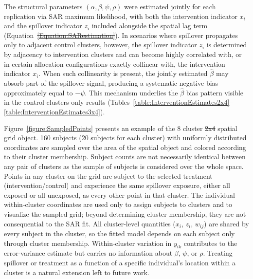 \documentclass{article}[11pt]
\makeatletter
\providecommand{\DIFaddtex}[1]{{\protect\color{blue}\uwave{#1}}} %
\providecommand{\DIFdeltex}[1]{{\protect\color{red}\sout{#1}}} %
\providecommand{\DIFaddbegin}{} %
\providecommand{\DIFaddend}{} %
\providecommand{\DIFdelbegin}{} %
\providecommand{\DIFdelend}{} %
\providecommand{\DIFadd}[1]{\texorpdfstring{\DIFaddtex{#1}}{#1}} %
\providecommand{\DIFdel}[1]{\texorpdfstring{\DIFdeltex{#1}}{}} %
\providecommand{\DIFscaledelfig}{0.5}
\newlength{\DIFdelgraphicswidth} %
\newlength{\DIFdelgraphicsheight} %
\providecommand{\DIFaddincludegraphics}[2][]{{\color{blue}\fbox{\DIFOincludegraphics[#1]{#2}}}} %
\providecommand{\DIFdelincludegraphics}[2][]{%
\sbox{\DIFdelgraphicsbox}{\DIFOincludegraphics[#1]{#2}}%
\settoboxwidth{\DIFdelgraphicswidth}{\DIFdelgraphicsbox} %
\settoboxtotalheight{\DIFdelgraphicsheight}{\DIFdelgraphicsbox} %
\scalebox{\DIFscaledelfig}{%
\parbox[b]{\DIFdelgraphicswidth}{\usebox{\DIFdelgraphicsbox}\\[-\baselineskip] \rule{\DIFdelgraphicswidth}{0em}}\llap{\resizebox{\DIFdelgraphicswidth}{\DIFdelgraphicsheight}{%
\setlength{\unitlength}{\DIFdelgraphicswidth}%
\begin{picture}(1,1)%
\thicklines\linethickness{2pt} %
{\color[rgb]{1,0,0}\put(0,0){\framebox(1,1){}}}%
{\color[rgb]{1,0,0}\put(0,0){\line( 1,1){1}}}%
{\color[rgb]{1,0,0}\put(0,1){\line(1,-1){1}}}%
\end{picture}%
}\hspace*{3pt}}} %
} %
\DeclareRobustCommand{\DIFaddbegin}{\DIFOaddbegin \let\includegraphics\DIFaddincludegraphics} %
\DeclareRobustCommand{\DIFaddend}{\DIFOaddend \let\includegraphics\DIFOincludegraphics} %
\DeclareRobustCommand{\DIFdelbegin}{\DIFOdelbegin \let\includegraphics\DIFdelincludegraphics} %
\DeclareRobustCommand{\DIFdelend}{\DIFOaddend \let\includegraphics\DIFOincludegraphics} %
\let\sout@orig\sout %
\renewcommand{\sout}[1]{\ifmmode\text{\sout@orig{\ensuremath{#1}}}\else\sout@orig{#1}\fi} %
\makeatother
\begin{document}
The structural parameters $(\alpha, \beta, \psi, \rho)$ were estimated jointly for each replication via SAR maximum likelihood, with both the intervention indicator $x_i$ and the spillover indicator $z_i$ included alongside the spatial lag term (Equation~\DIFdelbegin \DIFdel{\ref{Equation:SARestimation}}\DIFdelend \DIFaddbegin \DIFadd{\ref{Equation:SARmodel}}\DIFaddend ). In scenarios where spillover propagates only to adjacent control clusters, however, the spillover indicator $z_i$ is determined by adjacency to intervention clusters and can become highly correlated with, or in certain allocation configurations exactly collinear with, the intervention indicator $x_i$. When such collinearity is present, the jointly estimated $\hat{\beta}$ may absorb part of the spillover signal, producing a systematic negative bias approximately equal to $-\psi$. This mechanism underlies the $\hat{\beta}$ bias pattern visible in the control-clusters-only results (Tables~\ref{table:InterventionEstimates2x4}--\ref{table:InterventionEstimates3x4}).


Figure~\ref{figure:SampledPoints} presents an example of the 8 cluster \DIFdelbegin \DIFdel{2x4 }\DIFdelend \DIFaddbegin \DIFadd{$2\times4$ }\DIFaddend spatial grid object. 160 subjects (20 subjects for each cluster) with uniformly distributed coordinates are sampled over the area of the spatial object and colored according to their cluster membership. Subject counts are not necessarily identical between any pair of clusters as the sample of subjects is considered over the whole space. Points in any cluster on the grid are subject to the selected treatment (intervention/control) and experience the same spillover exposure, either all exposed or all unexposed, as every other point in that cluster. The individual within-cluster coordinates are used only to assign subjects to clusters and to visualize the sampled grid; beyond determining cluster membership, they are not consequential to the SAR fit. All cluster-level quantities ($x_i$, $z_i$, $w_{ij}$) are shared by every subject in the cluster, so the fitted model depends on each subject only through cluster membership. Within-cluster variation in \DIFdelbegin \DIFdel{$y_{ik}$ }\DIFdelend \DIFaddbegin \DIFadd{individual outcomes }\DIFaddend contributes to the error-variance estimate but carries no information about $\beta$, $\psi$, or $\rho$. Treating spillover or treatment as a function of a specific individual's location within a cluster is a natural extension left to future work.
\end{document}

